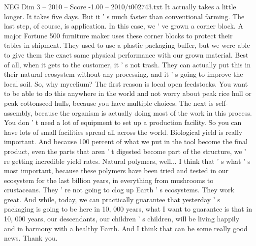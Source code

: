 \begin{textsample}{NEG Dim 3 – 2010 – Score -1.00 – 2010/t002743.txt}
It actually takes a little longer.
It takes five days.
But it ' s much faster than conventional farming.
The last step, of course, is application.
In this case, we ' ve grown a corner block.
A major Fortune 500 furniture maker uses these corner blocks to protect their tables in shipment.
They used to use a plastic packaging buffer, but we were able to give them the exact same physical performance with our grown material.
Best of all, when it gets to the customer, it ' s not trash.
They can actually put this in their natural ecosystem without any processing, and it ' s going to improve the local soil.
So, why mycelium?
The first reason is local open feedstocks.
You want to be able to do this anywhere in the world and not worry about peak rice hull or peak cottonseed hulls, because you have multiple choices.
The next is self- assembly, because the organism is actually doing most of the work in this process.
You don ' t need a lot of equipment to set up a production facility.
So you can have lots of small facilities spread all across the world.
Biological yield is really important.
And because 100 percent of what we put in the tool become the final product, even the parts that aren ' t digested become part of the structure, we ' re getting incredible yield rates.
Natural polymers, well...
I think that ' s what ' s most important, because these polymers have been tried and tested in our ecosystem for the last billion years, in everything from mushrooms to crustaceans.
They ' re not going to clog up Earth ' s ecosystems.
They work great.
And while, today, we can practically guarantee that yesterday ' s packaging is going to be here in 10, 000 years, what I want to guarantee is that in 10, 000 years, our descendants, our children ' s children, will be living happily and in harmony with a healthy Earth.
And I think that can be some really good news.
Thank you.

\end{textsample}
